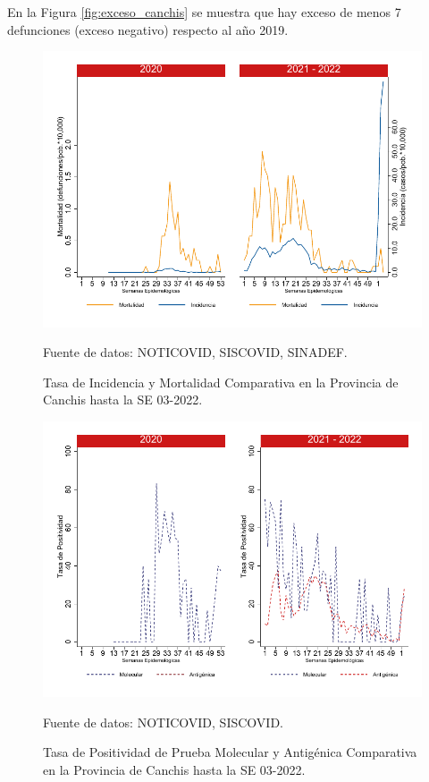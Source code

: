 \documentclass[12pt,a4paper,openany]{book}
\begin{document}
		En la Figura \ref{fig:exceso_canchis} se muestra que hay exceso de menos 7 defunciones (exceso negativo) respecto al año 2019.
		
		\begin{figure}[h]
			\caption{Tasa de Incidencia y Mortalidad Comparativa en la Provincia de Canchis hasta la SE 03-2022.}\label{fig:inc_mort_canchis}
			\begin{center}
				\includegraphics[width=0.7\linewidth]{../figuras/incidencia_mortalidad_20_21_5}
			\end{center}
			{\footnotesize {Fuente de datos: NOTICOVID, SISCOVID, SINADEF.}}
		\end{figure}
		
		\begin{figure}[h]
			\caption{Tasa de Positividad de Prueba Molecular y Antigénica Comparativa en la Provincia de Canchis hasta la SE 03-2022.}\label{fig:positividad_canchis}
			\begin{center}
				\includegraphics[width=0.7\linewidth]{../figuras/positividad_20_21_5}
			\end{center}
			{\footnotesize {Fuente de datos: NOTICOVID, SISCOVID.}}
		\end{figure}
		
\end{document}
